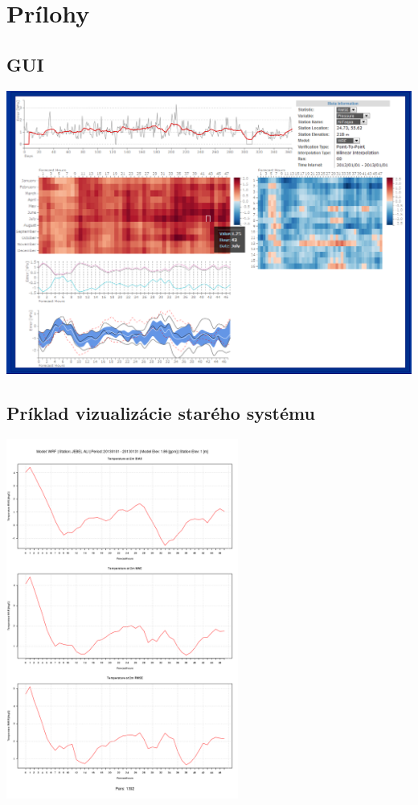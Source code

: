 \appendix
\chapter{Prílohy}

\section{GUI}
{ \hspace*{-0.3in}
\includegraphics[width=7in]{gui} 
}

\section{Príklad vizualizácie starého systému}
\label{sec:oldsys}
{ \hspace*{-0.3in}
	\includegraphics[width=3in]{oldsys} 
}

